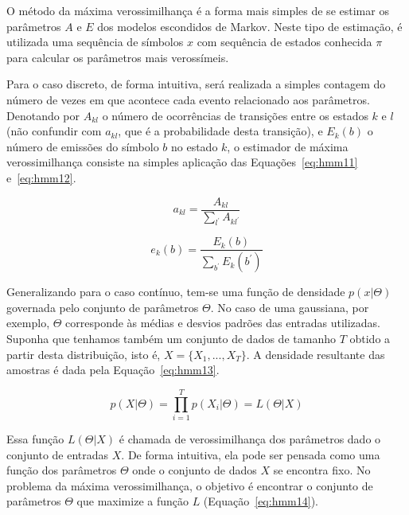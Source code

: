 O método da máxima verossimilhança é a forma mais simples de se estimar os parâmetros $ A $ e $ E $ dos modelos escondidos de Markov. Neste tipo de estimação, é utilizada uma sequência de símbolos $ x $ com sequência de estados conhecida $ \pi $ para calcular os parâmetros mais verossímeis.

Para o caso discreto, de forma intuitiva, será realizada a simples contagem do número de vezes em que acontece cada evento relacionado aos parâmetros. Denotando por $ A_{kl} $ o número de ocorrências de transições entre os estados $ k $ e $ l $ (não confundir com $ a_{kl} $, que é a probabilidade desta transição), e $ E_k(b) $ o número de emissões do símbolo $ b $ no estado $ k $, o estimador de máxima verossimilhança consiste na simples aplicação das Equações~\ref{eq:hmm11} e~\ref{eq:hmm12}.

\begin{equation}\label{eq:hmm11}
    a_{kl} = \frac{A_{kl}}{\sum_{l^\prime} A_{k{l}^{\prime}}}
\end{equation}

\begin{equation}\label{eq:hmm12}
    e_k(b) = \frac{E_k(b)}{\sum_{b^\prime} E_k(b^\prime)}
\end{equation}

Generalizando para o caso contínuo, tem-se uma função de densidade $ p(x|\Theta) $ governada pelo conjunto de parâmetros $ \Theta $. No caso de uma gaussiana, por exemplo, $ \Theta $ corresponde às médias e desvios padrões das entradas utilizadas. Suponha que tenhamos também um conjunto de dados de tamanho $ T $ obtido a partir desta distribuição, isto é, $ X = \{X_1,...,X_T\} $. A densidade resultante das amostras é dada pela Equação~\ref{eq:hmm13}.

\begin{equation}\label{eq:hmm13}
    p(X|\Theta) = \prod_{i=1}^{T}{ p(X_i|\Theta) } = L(\Theta|X)
\end{equation}

Essa função $ L(\Theta|X) $ é chamada de verossimilhança dos parâmetros dado o conjunto de entradas $ X $. De forma intuitiva, ela pode ser pensada como uma função dos parâmetros $ \Theta $ onde o conjunto de dados $ X $ se encontra fixo. No problema da máxima verossimilhança, o objetivo é encontrar o conjunto de parâmetros $ \Theta $ que maximize a função $ L $ (Equação~\ref{eq:hmm14}).

